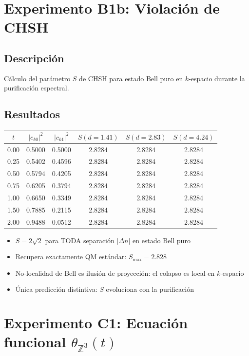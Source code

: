 \documentclass[12pt]{article}
\begin{document}
\section{Experimento B1b: Violaci\'on de CHSH}

\subsection{Descripci\'on}
C\'alculo del par\'ametro $S$ de CHSH para estado Bell puro en $k$-espacio durante la purificaci\'on espectral.

\subsection{Resultados}
\begin{center}
\begin{tabular}{cccccc}
\toprule
$t$ & $|c_{k0}|^2$ & $|c_{k1}|^2$ & $S(d=1.41)$ & $S(d=2.83)$ & $S(d=4.24)$ \\
\midrule
0.00 & 0.5000 & 0.5000 & 2.8284 & 2.8284 & 2.8284 \\
0.25 & 0.5402 & 0.4596 & 2.8284 & 2.8284 & 2.8284 \\
0.50 & 0.5794 & 0.4205 & 2.8284 & 2.8284 & 2.8284 \\
0.75 & 0.6205 & 0.3794 & 2.8284 & 2.8284 & 2.8284 \\
1.00 & 0.6650 & 0.3349 & 2.8284 & 2.8284 & 2.8284 \\
1.50 & 0.7885 & 0.2115 & 2.8284 & 2.8284 & 2.8284 \\
2.00 & 0.9488 & 0.0512 & 2.8284 & 2.8284 & 2.8284 \\
\bottomrule
\end{tabular}
\end{center}

\begin{itemize}
  \item $S = 2\sqrt{2}$ para TODA separaci\'on $|\Delta n|$ en estado Bell puro
  \item Recupera exactamente QM est\'andar: $S_{\max} = 2.828$
  \item No-localidad de Bell es ilusi\'on de proyecci\'on: el colapso es local en $k$-espacio
  \item \'Unica predicci\'on distintiva: $S$ evoluciona con la purificaci\'on
\end{itemize}

\section{Experimento C1: Ecuaci\'on funcional $\theta_{\mathbb{Z}^3}(t)$}
\end{document}

